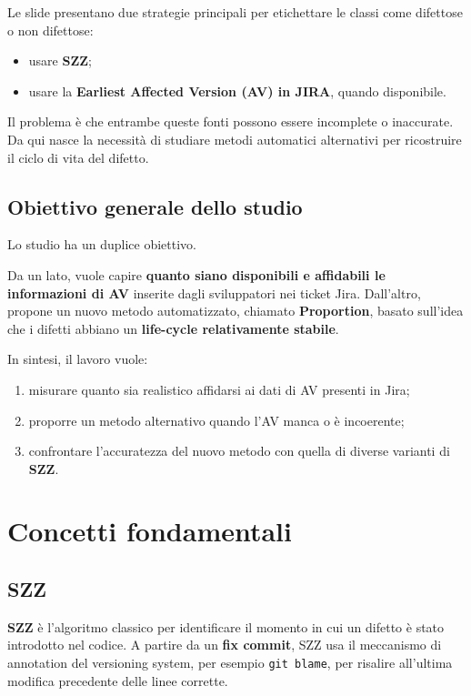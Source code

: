 Le slide presentano due strategie principali per etichettare le classi come difettose o non difettose:

\begin{itemize}
    \item usare \textbf{SZZ};
    \item usare la \textbf{Earliest Affected Version (AV) in JIRA}, quando disponibile.
\end{itemize}

Il problema è che entrambe queste fonti possono essere incomplete o inaccurate. Da qui nasce la necessità di studiare metodi automatici alternativi per ricostruire il ciclo di vita del difetto.

\subsection{Obiettivo generale dello studio}

Lo studio ha un duplice obiettivo.

Da un lato, vuole capire \textbf{quanto siano disponibili e affidabili le informazioni di AV} inserite dagli sviluppatori nei ticket Jira. Dall'altro, propone un nuovo metodo automatizzato, chiamato \textbf{Proportion}, basato sull'idea che i difetti abbiano un \textbf{life-cycle relativamente stabile}.

In sintesi, il lavoro vuole:

\begin{enumerate}
    \item misurare quanto sia realistico affidarsi ai dati di AV presenti in Jira;
    \item proporre un metodo alternativo quando l'AV manca o è incoerente;
    \item confrontare l'accuratezza del nuovo metodo con quella di diverse varianti di \textbf{SZZ}.
\end{enumerate}

\section{Concetti fondamentali}

\subsection{SZZ}

\textbf{SZZ} è l'algoritmo classico per identificare il momento in cui un difetto è stato introdotto nel codice. A partire da un \textbf{fix commit}, SZZ usa il meccanismo di annotation del versioning system, per esempio \texttt{git blame}, per risalire all'ultima modifica precedente delle linee corrette.

